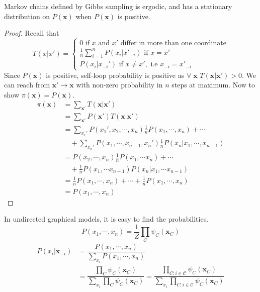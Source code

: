 \begin{thm}
Markov chains defined by Gibbs sampling is ergodic, and has a stationary distribution on $P(\mathbf x)$ when $P(\mathbf x)$ is positive.
\end{thm}
\begin{proof}
Recall that
\[
T(x|x') = \begin{cases}
	0 \text{ if } x \text{ and } x' \text{ differ in more than one coordinate} \\
	\frac{1}{n} \sum_{i=1}^n P(x_i | x'_{-i}) \text{ if } x = x' \\
	P(x_i | x_{-i}') \text{ if } x \neq x', \text{ i.e } x_{-i} = x'_{-i}
\end{cases}
\]
Since $P(\mathbf x)$ is positive, self-loop probability is positive as $\forall \; \mathbf x$ $T(\mathbf x | \mathbf x')> 0$.
We can reach from $\mathbf x' \to \mathbf x$ with non-zero probability in $n$ steps at maximum. Now to show $\pi(\mathbf x) = P(\mathbf x)$.
\begin{align*}
	\pi(\mathbf x) &= \sum_{\mathbf x'} T(\mathbf x | \mathbf x') \\
	&= \sum_{\mathbf x'} P(\mathbf x') T(\mathbf x | \mathbf x') \\
	&= \sum_{x_1'} P(x_1', x_2, \cdots, x_n) \frac{1}{n} P(x_1, \cdots, x_n) + \cdots \\&\quad+ \sum_{x_n'} P(x_1, \cdots, x_{n-1}, x_n') \frac{1}{n} P(x_n | x_1, \cdots, x_{n-1}) \\
	&= P(x_2, \cdots, x_n) \frac{1}{n} P(x_1, \cdots x_n) + \cdots \\&\quad+ \frac{1}{n} P(x_1, \cdots x_{n-1}) P(x_n | x_1, \cdots x_{n-1}) \\
	&= \frac{1}{n} P(x_1, \cdots, x_n) + \cdots + \frac{1}{n}P(x_1, \cdots, x_n) \\
	&= P(x_1, \cdots, x_n)
\end{align*} 
\end{proof}
In undirected graphical models, it is easy to find the probabilities.
\[
P(x_1, \cdots, x_n) = \dfrac{1}{Z} \prod_C \psi_C (\mathbf x_C)
\]
\begin{equation}
	\begin{split}
		P(x_i | \mathbf x_{-i}) &= \dfrac{P(x_1, \cdots, x_n)}{\sum_{x_i} P(x_1, \cdots, x_n)} \\ &= \dfrac{\prod_C \psi_C (\mathbf x_C)}{\sum_{x_i} \prod_C \psi_C(\mathbf x_C)} = \dfrac{\prod_{C: i \in \mathcal C} \psi_C(\mathbf x_C)}{\sum_{x_i}\prod_{C: i \in \mathcal C} \psi_C(\mathbf x_C)}
	\end{split}
	\end{equation}
